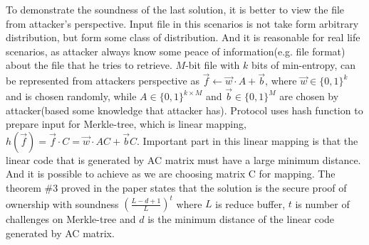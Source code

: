 \documentclass[12pt]{article}
\begin{document}
To demonstrate the soundness of the last solution, it is better to view the file from attacker's perspective. Input file in this scenarios is not take form arbitrary distribution, but form some class of distribution. And it is reasonable for real life scenarios, as attacker always know some peace of information(e.g. file format) about the file that he tries to retrieve. $M$-bit file with $k$ bits of min-entropy, can be represented from attackers perspective as $\vec{f}\leftarrow\vec{w}\cdot A +\vec{b}$, where $\vec{w} \in \{0,1\}^k$  and is chosen randomly, while $A\in\{0,1\}^{k\times M}$ and $\vec{b}\in\{0,1\}^M$ are chosen by attacker(based some knowledge that attacker has). Protocol uses hash function to prepare input for Merkle-tree, which is linear mapping, $h(\vec{f})=\vec{f}\cdot C = \vec{w}\cdot AC + \vec{b}C$.\cite{PoW} Important part in this linear mapping is that the linear code that is generated by AC matrix must have a large minimum distance. And it is possible to achieve as we are choosing matrix C for mapping. The theorem \#3 proved in the paper states that the solution is the secure proof of ownership with soundness $\left( \frac{L-d+1}{L}\right)^t$ where $L$ is reduce buffer, $t$ is number of challenges on Merkle-tree and $d$ is the minimum distance of the linear code generated by AC matrix.
\\\\
\end{document}
